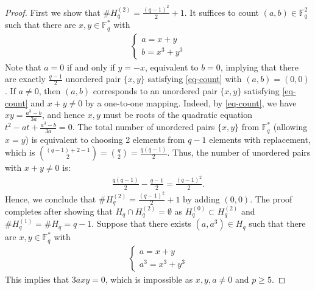 \documentclass{amsart}
\numberwithin{equation}{section}
\newcommand{\F}{\mathbb{F}}
\begin{document}
\begin{proof}
First we show that $\#H_q^{(2)}=\frac{(q-1)^2}{2}+1$.
It suffices to count $(a, b)\in \F_q^2$ such that there are $x, y\in \F_q^*$ with
\begin{align}
\label{eq-count}
  \begin{cases}
    a=x+y  \\
    b=x^3+y^3
  \end{cases}
\end{align}
Note that $a=0$ if and only if $y=-x$, equivalent to $b=0$, implying that there are exactly $\frac{q-1}{2}$ unordered pair $\{x, y\}$ satisfying \eqref{eq-count} with $(a, b)=(0, 0)$. 
If $a\neq 0$, then $(a, b)$ corresponds to an unordered pair $\{x, y\}$ satisfying \eqref{eq-count} and $x+y\neq 0$ by a one-to-one mapping. 
Indeed, by \eqref{eq-count}, we have $xy=\frac{a^3-b}{3a}$, and hence $x, y$ must be roots of the quadratic equation $t^2-at+\frac{a^3-b}{3a}=0$. 
The total number of unordered pairs $\{x,y\}$ from $\mathbb{F}_q^*$ (allowing $x=y$) is equivalent to choosing 2 elements from $q-1$ elements with replacement, which is $\binom{(q-1)+2-1}{2} = \binom{q}{2} = \frac{q(q-1)}{2}$.
Thus, the number of unordered pairs with $x+y \neq 0$ is:
\begin{align*}
    \frac{q(q-1)}{2} - \frac{q-1}{2} = \frac{(q-1)^2}{2}.
\end{align*}
Hence, we conclude that $\#H_q^{(2)} = \frac{(q-1)^2}{2}+1$ by adding $(0,0)$.
The proof completes after showing that $H_q \cap H_q^{(2)}=\emptyset$ as $H_q^{(0)} \subset H_q^{(2)}$ and $\#H_q^{(1)}=\#H_q=q-1$.
Suppose that there exists $(a, a^3) \in H_q$ such that there are $x, y \in \F_q^*$ with 
\begin{align*}
  \begin{cases}
    a=x+y  \\
    a^3=x^3+y^3
  \end{cases}
\end{align*}
This implies that $3axy=0$, which is impossible as $x, y, a \neq 0$ and $p\geq 5$.
\end{proof}
\end{document}

